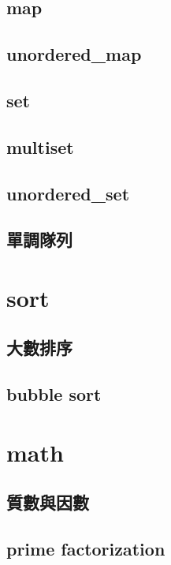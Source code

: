     \subsection{map}
        
    \subsection{unordered\_map}
        
    \subsection{set}
        
    \subsection{multiset}
        
    \subsection{unordered\_set}
        
    \subsection{單調隊列}
        

\section{sort}
    \subsection{大數排序}
        
    \subsection{bubble sort}
        

\section{math}
        \subsection{質數與因數}
            
        \subsection{prime factorization}
                
